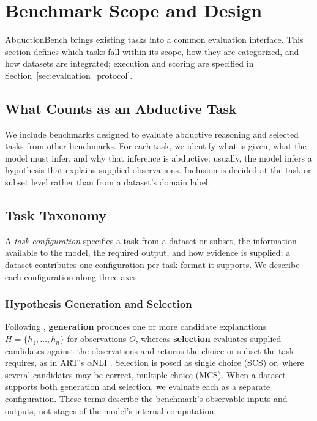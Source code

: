 \section{Benchmark Scope and Design}
\label{sec:framework}
\label{sec:methodology}

AbductionBench brings existing tasks into a common evaluation interface. This section defines which tasks fall within its scope, how they are categorized, and how datasets are integrated; execution and scoring are specified in Section~\ref{sec:evaluation_protocol}.

\subsection{What Counts as an Abductive Task}
\label{sec:framework_scope}

We include benchmarks designed to evaluate abductive reasoning and selected tasks from other benchmarks. For each task, we identify what is given, what the model must infer, and why that inference is abductive: usually, the model infers a hypothesis that explains supplied observations. Inclusion is decided at the task or subset level rather than from a dataset's domain label.

\subsection{Task Taxonomy}
\label{sec:task_representation}

A \emph{task configuration} specifies a task from a dataset or subset, the information available to the model, the required output, and how evidence is supplied; a dataset contributes one configuration per task format it supports. We describe each configuration along three axes.

\subsubsection{Hypothesis Generation and Selection}
\label{sec:methodology_task_formulation}

Following \citet{salimi2026wiring}, \textbf{generation} produces one or more candidate explanations $H=\{h_1,\ldots,h_n\}$ for observations $O$, whereas \textbf{selection} evaluates supplied candidates against the observations and returns the choice or subset the task requires, as in ART's $\alpha$NLI \citep{Bhagavatula2020Abductive}. Selection is posed as single choice (SCS) or, where several candidates may be correct, multiple choice (MCS). When a dataset supports both generation and selection, we evaluate each as a separate configuration. These terms describe the benchmark's observable inputs and outputs, not stages of the model's internal computation.

